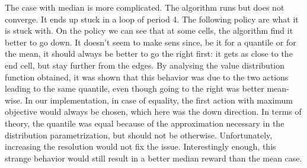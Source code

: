 The case with median is more complicated. The algorithm runs but does not converge. It ends up stuck in a loop of period 4. The following policy are what it is stuck with. On the policy we can see that at some cells, the algorithm find it better to go down. It doesn’t seem to make sens since, be it for a quantile or for the mean, it should always be better to go the right first: it gets as close to the end cell, but stay further from the edges. By analysing the value distribution function obtained, it was shown that this behavior was due to the two actions leading to the same quantile, even though going to the right was better mean-wise. In our implementation, in case of equality, the first action with maximum objective would always be chosen, which here was the down direction. In terms of theory, the quantile was equal because of the approximation necessary in the distribution parametrization, but should not be otherwise. Unfortunately, increasing the resolution would not fix the issue. Interestingly enough, this strange behavior would still result in a better median reward than the mean case.


